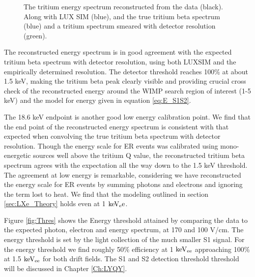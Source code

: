 \begin{figure}[h!]
\caption{The tritium energy spectrum reconstructed from the data (black). Along with LUX SIM (blue), and the true tritium beta spectrum (blue) and a tritium spectrum smeared with detector resolution (green). }
\label{fig:E_spec}
\end{figure}

The reconstructed energy spectrum is in good agreement with the expected tritium beta spectrum with detector resolution, using both LUXSIM and the empirically determined resolution. The detector threshold reaches 100\% at about 1.5 keV, making the tritium beta peak clearly visible and providing crucial cross check of the reconstructed energy around the WIMP search region of interest (1-5 keV) and the model for energy given in equation \ref{eq:E_S1S2}. 

The 18.6 keV endpoint is another good low energy calibration point. We find that the end point of the reconstructed energy spectrum is consistent with that expected when convolving the true tritium beta spectrum with detector resolution. Though the energy scale for ER events was calibrated using mono-energetic sources well above the tritium Q value, the reconstructed tritium beta spectrum agrees with the expectation all the way down to the 1.5 keV threshold. The agreement at low energy is remarkable, considering we have reconstructed the energy scale for ER events by summing photons and electrons and ignoring the term lost to heat. We find that the modeling outlined in section \ref{sec:LXe_Theory} holds even at 1 $\rm keV_ee$.



Figure \ref{fig:Thres} shows the Energy threshold attained by comparing the data to the expected photon, electron and energy spectrum, at 170 and 100 V/cm. The energy threshold is set by the light collection of the much smaller S1 signal. For the energy threshold we find roughly 50\% efficiency at 1 $\rm keV_{ee}$ approaching 100\% at 1.5 $\rm keV_{ee}$ for both drift fields. The S1 and S2 detection threshold threshold will be discussed in Chapter \ref{Ch:LYQY}.


